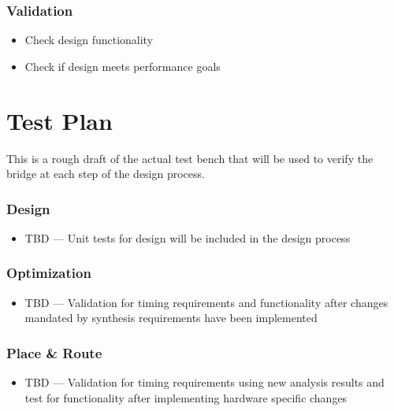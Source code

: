 \documentclass[]{report}   %
\begin{document}
\subsection{Validation}
\begin{itemize}
  \item{Check design functionality}
  \item{Check if design meets performance goals}
\end{itemize}

\chapter{Test Plan}
This is a rough draft of the actual test bench that will be used to verify the bridge at each step of the design process.
\linebreak

\subsection{Design}
\begin{itemize}
  \item{TBD --- Unit tests for design will be included in the design process}
\end{itemize}

\subsection{Optimization}
\begin{itemize}
    \item{TBD --- Validation for timing requirements and functionality after changes mandated by synthesis requirements have been implemented}
\end{itemize}
\subsection{Place \& Route}
\begin{itemize}
  \item{TBD --- Validation for timing requirements using new analysis results and test for functionality after implementing hardware specific changes}
\end{itemize}
\end{document}
